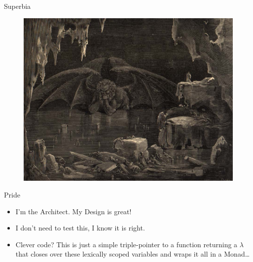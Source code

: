 \documentclass[12pt,xcolor=x11names]{beamer}
\begin{document}
\begin{frame}{Superbia}
    \begin{figure}
        \centering \includegraphics[height=0.75\textheight]{images/pride.jpg}
    \end{figure}
\end{frame}
\begin{frame}{Pride}
    \begin{itemize}
        \item I'm the Architect. My Design is great!
        \item I don't need to test this, I know it is right.
        \item Clever code? This is just a simple triple-pointer to a function
            returning a $\lambda$ that closes over these lexically scoped
            variables and wraps it all in a Monad\ldots
    \end{itemize}
\end{frame}
\end{document}

